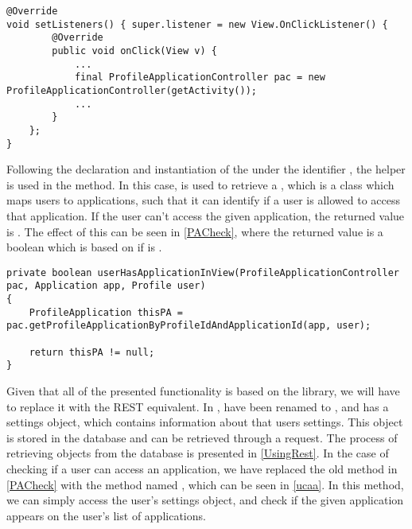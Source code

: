 \begin{minipage}[H]{\linewidth}
\begin{lstlisting}[caption = Declaration of the
\ttt{ProfileApplicationController} which is used to retrieve information about \ttt{ProfileApplications}, label = pac] 
@Override 
void setListeners() { super.listener = new View.OnClickListener() {
 		@Override 
 		public void onClick(View v) {
			...
    		final ProfileApplicationController pac = new ProfileApplicationController(getActivity()); 
    		...
    	}
	};
}
\end{lstlisting}
\end{minipage}

Following the declaration and instantiation of the
 under the identifier , the
helper is used in the  method. In this case,
 is used to retrieve a , which is a class
which maps users to applications, such that it can identify if a user is allowed
to access that application. If the user can't access the given application, the
returned value is . The effect of this can be seen in
\autoref{PACheck}, where the returned value is a boolean which is based on if  is
.\nl

\begin{minipage}[H]{\linewidth}
\begin{lstlisting}[caption = Method which checks if a user is allowed to access an application, label = PACheck] 
private boolean userHasApplicationInView(ProfileApplicationController pac, Application app, Profile user) 
{ 
	ProfileApplication thisPA = pac.getProfileApplicationByProfileIdAndApplicationId(app, user);

    return thisPA != null;
}
\end{lstlisting}
\end{minipage}

Given that all of the presented functionality is based on the 
library, we will have to replace it with the REST equivalent. In \rmlib,
 have been renamed to , and has a settings object,
which contains information about that users settings. This object is stored in
the database and can be retrieved through a request. The process of retrieving
objects from the database is presented in \autoref{UsingRest}.
In the case of checking if a user can access an application, we have replaced
the old method in \autoref{PACheck} with the method named
, which can be seen in \autoref{ucaa}. In this method,
we can simply access the user's settings object, and check if the given
application appears on the user's list of applications.\nl

